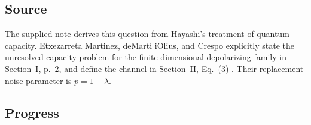 \subsection*{Source}

The supplied note derives this question from Hayashi's treatment of quantum capacity. Etxezarreta Martinez, deMarti iOlius, and Crespo explicitly state the unresolved capacity problem for the finite-dimensional depolarizing family in Section~I, p.~2, and define the channel in Section~II, Eq.~(3) . Their replacement-noise parameter is $p=1-\lambda$.

\subsection*{Progress}

